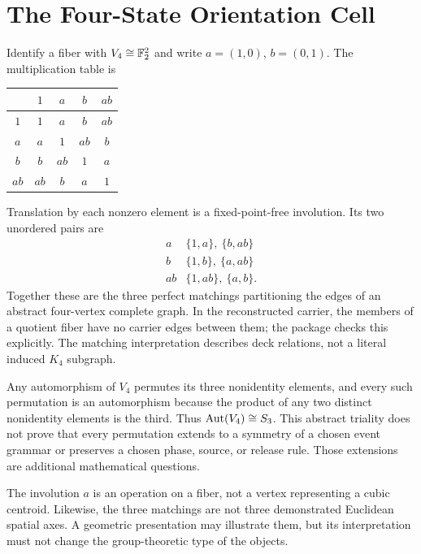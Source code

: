\section{The Four-State Orientation Cell}
\label{app:v4}
Identify a fiber with $V_4\cong\mathbb F_2^2$ and write $a=(1,0)$, $b=(0,1)$. The multiplication table is
\begin{center}
\begin{tabular}{c|cccc}
 & $1$ & $a$ & $b$ & $ab$\\\hline
$1$ & $1$ & $a$ & $b$ & $ab$\\
$a$ & $a$ & $1$ & $ab$ & $b$\\
$b$ & $b$ & $ab$ & $1$ & $a$\\
$ab$ & $ab$ & $b$ & $a$ & $1$
\end{tabular}
\end{center}
Translation by each nonzero element is a fixed-point-free involution. Its two unordered pairs are
\[
\begin{array}{c|c}
a & \{1,a\},\ \{b,ab\}\\
b & \{1,b\},\ \{a,ab\}\\
ab & \{1,ab\},\ \{a,b\}.
\end{array}
\]
Together these are the three perfect matchings partitioning the edges of an abstract four-vertex complete graph. In the reconstructed carrier, the members of a quotient fiber have no carrier edges between them; the package checks this explicitly. The matching interpretation describes deck relations, not a literal induced $K_4$ subgraph.

Any automorphism of $V_4$ permutes its three nonidentity elements, and every such permutation is an automorphism because the product of any two distinct nonidentity elements is the third. Thus $\operatorname{Aut}(V_4)\cong S_3$. This abstract triality does not prove that every permutation extends to a symmetry of a chosen event grammar or preserves a chosen phase, source, or release rule. Those extensions are additional mathematical questions.

The involution $a$ is an operation on a fiber, not a vertex representing a cubic centroid. Likewise, the three matchings are not three demonstrated Euclidean spatial axes. A geometric presentation may illustrate them, but its interpretation must not change the group-theoretic type of the objects.
